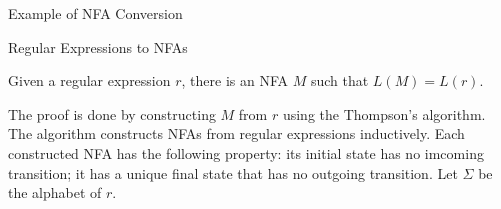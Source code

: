 \documentclass{beamer}
\begin{document}
\begin{frame}{Example of NFA Conversion} 

\end{frame}

\begin{frame}[allowframebreaks]{Regular Expressions to NFAs}
\begin{theorem} Given a regular expression $r$, there is an NFA $M$ such that $L(M)=L(r)$. \end{theorem}

 The proof is done by constructing $M$ from $r$ using the Thompson's algorithm. 
The algorithm constructs NFAs from regular expressions inductively.
Each constructed NFA has the following property: its initial state has no imcoming transition; 
it has a unique final state that has no outgoing transition. Let $\Sigma$ be the alphabet of $r$. 


\end{frame}
\end{document}
